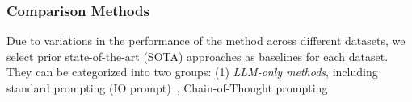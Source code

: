 \documentclass{article}
\begin{document}
\vspace{-2mm}
\subsubsection{Comparison Methods}
\vspace{-2mm}
Due to variations in the performance of the method across different datasets, we select prior state-of-the-art (SOTA) approaches as baselines for each dataset.
They can be categorized into two groups: (1) \textit{LLM-only methods}, including standard prompting (IO prompt)~\cite{brown2020language}, Chain-of-Thought prompting \begin{table}
\small
\centering
\vspace{-4mm}
\caption{Performance comparison of different methods on CWQ and WebQSP.}
\label{Tab:maincw}
\end{table}
\end{document}
